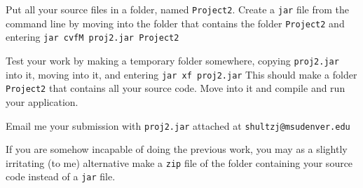   Put all your source files in a folder, named {\tt Project2}.
  Create a {\tt jar} file from the command line by moving into the folder that contains the folder {\tt Project2}
  and entering
  \smallskip
  {\tt jar cvfM proj2.jar Project2}
  \medskip
  
  Test your work by making a temporary folder somewhere, copying {\tt proj2.jar} into it, moving into it,
  and entering
  \smallskip
  {\tt jar xf  proj2.jar}
  \smallskip
  This should make a folder {\tt Project2} that contains all your source code.  Move into it and compile and
  run your application.
   \medskip
   
   Email me your submission with {\tt proj2.jar} attached at {\tt shultzj@msudenver.edu}
  \bigskip
  
  If you are somehow incapable of doing the previous work, you may as a slightly irritating (to me) alternative
  make a {\tt zip} file of the folder containing your source code instead of a {\tt jar} file.
\medskip
\Out



\vfil\eject
\bye

